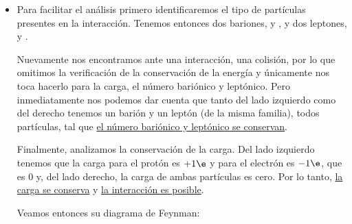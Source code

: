 \documentclass[./../main.tex]{subfiles}
\begin{document}
\begin{exercise}
\begin{solution}
\begin{itemize}
                \item {}

                Para facilitar el análisis primero identificaremos el tipo de partículas presentes en la interacción. 
                Tenemos entonces dos bariones,  y , y dos leptones, \ch{\e-} y \ch{\nu_{\e}}.

                Nuevamente nos encontramos ante una interacción, \idest una colisión, por lo que omitimos la verificación de la conservación de la energía y únicamente nos toca hacerlo para la carga, el número bariónico y leptónico. Pero inmediatamente nos podemos dar cuenta que tanto del lado izquierdo como del derecho tenemos un barión y un leptón (de la misma familia), todos partículas, tal que \ul{el número bariónico y leptónico se conservan}.

                Finalmente, analizamos la conservación de la carga. Del lado izquierdo tenemos que la carga para el protón es \(+1\e\) y para el electrón es \(-1\e\), que es 0 y, del lado derecho, la carga de ambas partículas es cero. Por lo tanto, \ul{la carga se conserva} y \ul{la interacción es posible}.

                Veamos entonces su diagrama de Feynman:

                \begin{figure}[htb]
                    \centering
\end{figure}
\end{itemize}
\end{solution}
\end{exercise}
\end{document}
